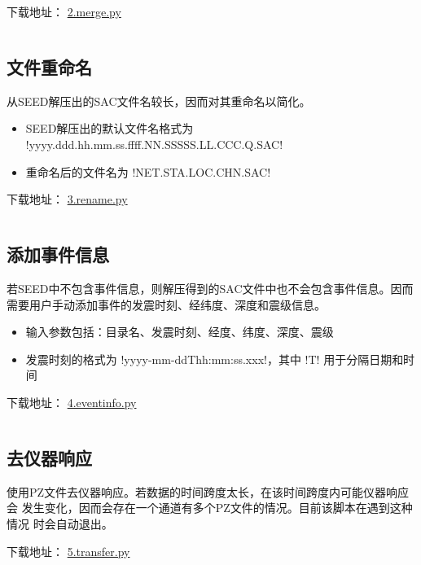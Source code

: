 下载地址： \href{https://raw.githubusercontent.com/seisman/SAC_Docs_zh/master/call-in-script/2.merge.py}{2.merge.py}
\inputminted{python}{./call-in-script/2.merge.py}

\subsection{文件重命名}
\label{subsec:rename-in-python}
从SEED解压出的SAC文件名较长，因而对其重命名以简化。
\begin{itemize}
\item SEED解压出的默认文件名格式为 !yyyy.ddd.hh.mm.ss.ffff.NN.SSSSS.LL.CCC.Q.SAC!
\item 重命名后的文件名为 !NET.STA.LOC.CHN.SAC!
\end{itemize}

下载地址： \href{https://raw.githubusercontent.com/seisman/SAC_Docs_zh/master/call-in-script/3.rename.py}{3.rename.py}
\inputminted{python}{./call-in-script/3.rename.py}

\subsection{添加事件信息}
\label{subsec:event-info-python}
若SEED中不包含事件信息，则解压得到的SAC文件中也不会包含事件信息。因而
需要用户手动添加事件的发震时刻、经纬度、深度和震级信息。
\begin{itemize}
\item 输入参数包括：目录名、发震时刻、经度、纬度、深度、震级
\item 发震时刻的格式为 !yyyy-mm-ddThh:mm:ss.xxx!，其中 !T!
    用于分隔日期和时间
\end{itemize}

下载地址： \href{https://raw.githubusercontent.com/seisman/SAC_Docs_zh/master/call-in-script/4.eventinfo.py}{4.eventinfo.py}
\inputminted{python}{./call-in-script/4.eventinfo.py}

\subsection{去仪器响应}
\label{subsec:transfer-python}
使用PZ文件去仪器响应。若数据的时间跨度太长，在该时间跨度内可能仪器响应会
发生变化，因而会存在一个通道有多个PZ文件的情况。目前该脚本在遇到这种情况
时会自动退出。

下载地址： \href{https://raw.githubusercontent.com/seisman/SAC_Docs_zh/master/call-in-script/5.transfer.py}{5.transfer.py}
\inputminted{python}{./call-in-script/5.transfer.py}

